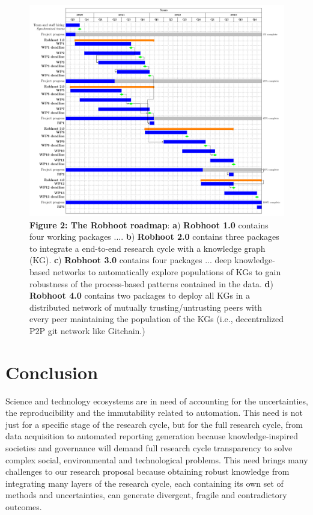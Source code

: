 \documentclass[10pt, a4paper, twocolumn]{article} %
\begin{document}
\begin{figure}[ht]
  \centering \includegraphics[width=1\textwidth]{GanttChart.pdf}
  {\small {\bf Figure 2: The Robhoot roadmap}: {\bf a}) {\bf Robhoot
      1.0} contains four working packages .... {\bf b}) {\bf Robhoot
      2.0} contains three packages to integrate a end-to-end research
    cycle with a knowledge graph (KG). {\bf c}) {\bf Robhoot 3.0}
    contains four packages ... deep knowledge-based networks to
    automatically explore populations of KGs to gain robustness of the
    process-based patterns contained in the data. {\bf d}) {\bf
      Robhoot 4.0} contains two packages to deploy all KGs in a
    distributed network of mutually trusting/untrusting peers with
    every peer maintaining the population of the KGs (i.e.,
    decentralized P2P git network like Gitchain.)}
\end{figure}


\newpage
\section{Conclusion}
Science and technology ecosystems are in need of accounting for the
uncertainties, the reproducibility and the immutability related to
automation. This need is not just for a specific stage of the research
cycle, but for the full research cycle, from data acquisition to
automated reporting generation because knowledge-inspired societies
and governance will demand full research cycle transparency to solve
complex social, environmental and technological problems. This need
brings many challenges to our research proposal because obtaining
robust knowledge from integrating many layers of the research cycle,
each containing its own set of methods and uncertainties, can generate
divergent, fragile and contradictory outcomes.
\end{document}
